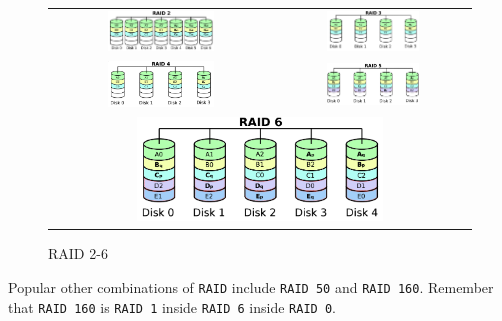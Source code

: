 \begin{figure}[H]
  \centering
  \begin{tabular}{cc}
    \includegraphics[width=0.5\textwidth]{images/raid2} &
    \includegraphics[width=0.5\textwidth]{images/raid3}\\
    \includegraphics[width=0.5\textwidth]{images/raid4} &
    \includegraphics[width=0.5\textwidth]{images/raid5}\\
    \multicolumn{2}{c}{\includegraphics[width=0.6\textwidth]{images/raid6}}
  \end{tabular}
  \caption{RAID 2-6}
  \label{raid2-6}
\end{figure}

Popular other combinations of \texttt{RAID} include \texttt{RAID 50} and
\texttt{RAID 160}. Remember that \texttt{RAID 160} is \texttt{RAID 1} inside
\texttt{RAID 6} inside \texttt{RAID 0}.

